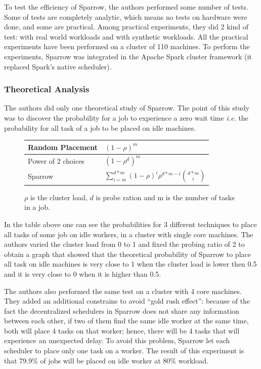 \documentclass[11pt]{article}
\begin{document}
    	To test the efficiency of Sparrow, the authors performed some number of tests. Some of tests are completely analytic, which means no tests on hardware were done, and some are practical. Among practical experiments, they did 2 kind of test: with real world workloads and with synthetic workloads. All the practical experiments have been performed on a cluster of 110 machines. To perform the experiments, Sparrow was integrated in the Apache Spark cluster framework (it replaced Spark's native scheduler).


		\subsubsection*{Theoretical Analysis}
			\label{theoreticalanalysis}
        
        	The authors did only one theoretical study of Sparrow. The point of this study was to discover the probability for a job to experience a zero wait time \textit{i.e.} the probability for all task of a job to be placed on idle machines.
            
            \begin{figure}[H]
            	\centering
                \begin{tabular}{ | l | l |}
                    \hline
                    Random Placement & $(1-\rho)^m$  \\ \hline
                    Power of 2 choices & $(1-\rho^d)^m$  \\ \hline
                    Sparrow & $\sum_{i=m}^{d*m}(1-\rho)^i$$\rho^{d*m-i}$${d*m}\choose{i}$ \\
                    \hline
                \end{tabular}
                \caption{$\rho$ is the cluster load, $d$ is probe ration and m is the number of tasks in a job.}
        	\end{figure}
            
            In the table above one can see the probabilities for 3 different techniques to place all tasks of some job on idle workers, in a cluster with single core machines. The authors varied the cluster load from 0 to 1 and fixed the probing ratio of 2 to obtain a graph that showed that the theoretical probability of Sparrow to place all task on idle machines is very close to 1 when the cluster load is lower then 0.5 and it is very close to 0 when it is higher than 0.5.
            
            The authors also performed the same test on a cluster with 4 core machines. They added an additional constrains to avoid ``gold rush effect'': because of the fact the decentralized schedulers in Sparrow does not share any information between each other, if two of them find the same idle worker at the same time, both will place 4 tasks on that worker; hence, there will be 4 tasks that will experience an unexpected delay. To avoid this problem, Sparrow let each scheduler to place only one task on a worker. The result of this experiment is that 79.9\% of jobs will be placed on idle worker at 80\% workload.
            
\end{document}
